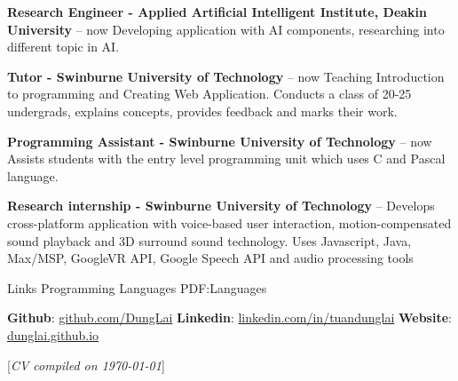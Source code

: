 \documentclass[letterpaper,MMMyyyy,nonstopmode]{simpleresumecv}
\newcommand{\CVNote}{CV compiled on {\today}}
\begin{document}
\begin{Body}
\BulletItem
\textbf{Research Engineer - Applied Artificial Intelligent Institute, Deakin University}
\hfill
{} -- now
\SubBulletItem Developing application with AI components, researching into different topic in AI.

\BulletItem
\textbf{Tutor - Swinburne University of Technology}
\hfill
{} -- now
\SubBulletItem Teaching Introduction to programming and Creating Web Application.
\SubBulletItem Conducts a class of 20-25 undergrads, explains concepts, provides feedback and marks their work.

\BulletItem
\textbf{Programming Assistant - Swinburne University of Technology}
\hfill
{} -- now
\SubBulletItem Assists students with the entry level programming unit which uses C and Pascal language.

\BulletItem
\textbf{Research internship - Swinburne University of Technology}
\hfill
{} --
\SubBulletItem Develops cross-platform application with voice-based user interaction, motion-compensated sound playback and 3D surround sound technology.
\SubBulletItem Uses Javascript, Java, Max/MSP, GoogleVR API, Google Speech API and audio processing tools

\Section 
{Links}
{Programming Languages}
{PDF:Languages}

\BulletItem \textbf{Github}: \href{https://github.com/DungLai}{\color{blue}github.com/DungLai}
\BulletItem \textbf{Linkedin}: \href{https://www.linkedin.com/in/tuandunglai/}{\color{blue}linkedin.com/in/tuandunglai}
\BulletItem \textbf{Website}: \href{https://dunglai.github.io/}{\color{blue}dunglai.github.io}
\end{Body}



\BigGap
\UseNoteFont%
\null\hfill%
[\textit{\CVNote}]
\end{document}
